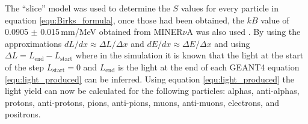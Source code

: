 The ``slice'' model was used to determine the $S$ values for every particle in equation \ref{equ:Birks_formula}, once those had been obtained, the $kB$ value of 0.0905 $\pm$ 0.015\,mm/MeV obtained from MINER$\nu$A was also used \cite{aliaga_2015}. By using the approximations $dL/dx \approx \Delta L / \Delta x$ and $dE/dx \approx \Delta E / \Delta x$ and using $\Delta L = L_{\textrm{end}} - L_{\textrm{start}} $ where in the simulation it is known that the light at the start of the step $L_{\textrm{start}} = 0$ and $L_{\textrm{end}}$ is the light at the end of each GEANT4 equation \ref{equ:light_produced} can be inferred. Using equation \ref{equ:light_produced} the light yield can now be calculated for the following particles: alphas, anti-alphas, protons, anti-protons, pions, anti-pions, muons, anti-muons, electrons, and positrons.

